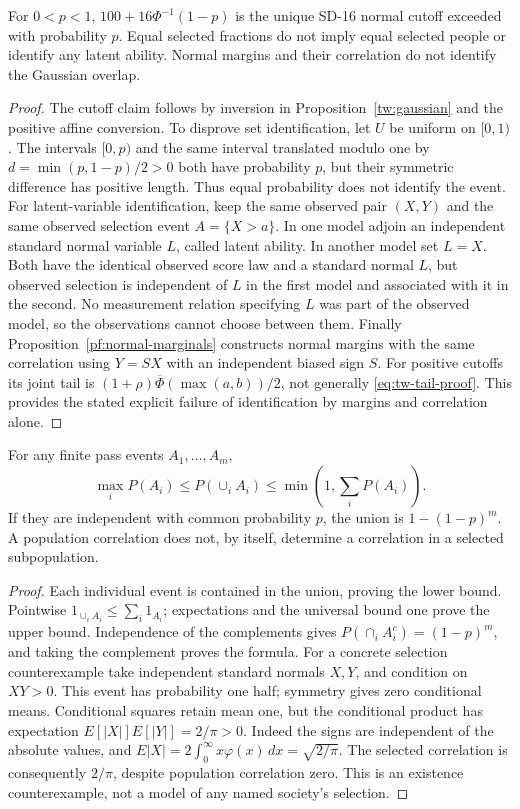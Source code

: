 \begin{proposition}
\label{tw:rarity}
For \(0<p<1\), \(100+16\Phi^{-1}(1-p)\) is the unique SD-16 normal
cutoff exceeded with probability \(p\). Equal selected fractions do not
imply equal selected people or identify any latent ability.
Normal margins and their correlation do not identify the Gaussian overlap.
\end{proposition}
\begin{proof}
The cutoff claim follows by inversion in Proposition~\ref{tw:gaussian}
and the positive affine conversion. To disprove set identification, let
\(U\) be uniform on \([0,1)\). The intervals \([0,p)\) and the same
interval translated modulo one by \(d=\min(p,1-p)/2>0\) both have
probability \(p\), but their symmetric difference has positive length.
Thus equal probability does not identify the event. For latent-variable
identification, keep the same observed pair \((X,Y)\) and the same observed
selection event \(A=\{X>a\}\). In one model
adjoin an independent standard normal variable \(L\), called latent ability.
In another model set \(L=X\). Both have the identical observed score law
and a standard normal \(L\), but observed selection is independent of
\(L\) in the first model and associated with it in the second. No
measurement relation specifying \(L\) was part of the observed model, so
the observations cannot choose between them. Finally
Proposition~\ref{pf:normal-marginals} constructs normal margins with the same
correlation using \(Y=SX\) with an independent biased sign \(S\).
For positive cutoffs its joint tail is
\((1+\rho)\overline\Phi(\max(a,b))/2\), not generally
\eqref{eq:tw-tail-proof}. This provides the stated explicit failure of
identification by margins and correlation alone.
\end{proof}

\begin{proposition}
\label{tw:attempts}
For any finite pass events \(A_1,\ldots,A_m\),
\[
 \max_iP(A_i)\leq P(\cup_iA_i)\leq\min(1,\sum_iP(A_i)).
\]
If they are independent with common probability \(p\), the union is
\(1-(1-p)^m\). A population correlation does not, by itself, determine a
correlation in a selected subpopulation.
\end{proposition}
\begin{proof}
Each individual event is contained in the union, proving the lower bound.
Pointwise \(1_{\cup_iA_i}\leq\sum_i1_{A_i}\); expectations and the
universal bound one prove the upper bound. Independence of the complements
gives \(P(\cap_iA_i^c)=(1-p)^m\), and taking the complement proves the
formula. For a concrete selection counterexample take independent standard
normals \(X,Y\), and condition on \(XY>0\). This event has probability
one half; symmetry gives zero conditional means. Conditional squares retain
mean one, but the conditional product has expectation
\(E[|X|]E[|Y|]=2/\pi>0\). Indeed the signs are independent of the
absolute values, and \(E|X|=2\int_0^\infty x\varphi(x)\,dx
=\sqrt{2/\pi}\). The selected correlation is consequently \(2/\pi\),
despite population correlation zero. This is an existence counterexample,
not a model of any named society's selection.
\end{proof}

